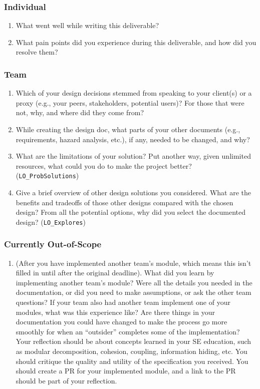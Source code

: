 \documentclass[12pt, titlepage]{article}
\begin{document}
\subsubsection*{Individual}
\begin{enumerate}
  \item What went well while writing this deliverable?
  \item What pain points did you experience during this deliverable, and how did you resolve them?
\end{enumerate}

\subsubsection*{Team}
\begin{enumerate}
  \item Which of your design decisions stemmed from speaking to your client(s) or a proxy (e.g., your peers, stakeholders, potential users)? For those that were not, why, and where did they come from?
  \item While creating the design doc, what parts of your other documents (e.g., requirements, hazard analysis, etc.), if any, needed to be changed, and why?
  \item What are the limitations of your solution? Put another way, given unlimited resources, what could you do to make the project better? (\texttt{LO\_ProbSolutions})
  \item Give a brief overview of other design solutions you considered. What are the benefits and tradeoffs of those other designs compared with the chosen design? From all the potential options, why did you select the documented design? (\texttt{LO\_Explores})
\end{enumerate}

\subsubsection*{Currently Out-of-Scope}
\begin{enumerate}
  \item (After you have implemented another team's module, which means this isn't filled in until after the original deadline). What did you learn by implementing another team's module? Were all the details you needed in the documentation, or did you need to make assumptions, or ask the other team questions? If your team also had another team implement one of your modules, what was this experience like? Are there things in your documentation you could have changed to make the process go more smoothly for when an ``outsider'' completes some of the implementation?
  Your reflection should be about concepts learned in your SE education, such as modular decomposition, cohesion, coupling, information hiding, etc. You should critique the quality and utility of the specification you received. You should create a PR for your implemented module, and a link to the PR should be part of your reflection.
\end{enumerate}
\end{document}
